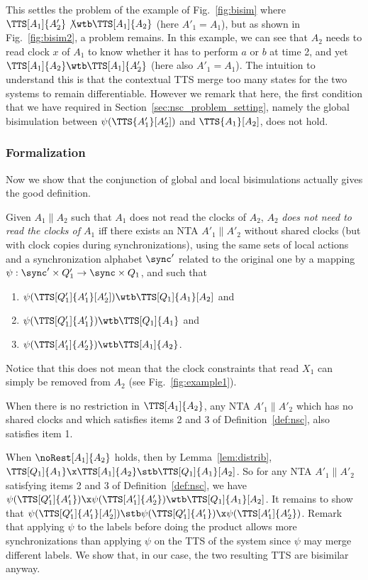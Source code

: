 \documentclass{LMCS}
\theoremstyle{plain}\newtheorem*{prop11}{Proposition~\ref{prop:states} bis}
\begin{document}
This settles the problem of the example of Fig.~\ref{fig:bisim} where
$\TTS[A_1]{A'_2}\not\wtb\TTS[A_1]{A_2}$ (here $A'_1=A_1$), but as shown in
Fig.~\ref{fig:bisim2}, a problem remains.
In this example, we can see that $A_2$
needs to read clock $x$ of $A_1$ to know whether it has to perform $a$
or $b$ at time 2, and yet $\TTS[A_1]{A_2}\wtb\TTS[A_1]{A_2'}$
(here also $A'_1=A_1$). The intuition
to understand this is that the contextual TTS merge too many states for the two
systems to remain differentiable. However we remark that here, the
first condition that we have required in Section~\ref{sec:nsc_problem_setting},
namely the global bisimulation between $\psi(\TTS{A'_1}[A'_2])$ and $\TTS{A_1}[A_2]$,
does not hold.


\subsubsection{Formalization}
Now we show that the conjunction of global and local bisimulations actually
gives the good definition.

\begin{defi}\label{def:nsc}
  Given $A_1\parallel A_2$ such that $A_1$ does not read the clocks of $A_2$,
  $A_2$ \emph{does not need to read the clocks of
    $A_1$} iff there exists an NTA $A'_1 \parallel A'_2$ without shared clocks
  (but with clock copies during synchronizations),
  using the same sets of local actions and a synchronization
  alphabet $\sync'$ related to the original one by a mapping $\psi: \sync'
  \times Q'_1 \rightarrow \sync \times Q_1$, and such that
  \begin{enumerate}
    \item $\psi(\TTS[Q_1']{A'_1}[A'_2])\wtb\TTS[Q_1]{A_1}[A_2]$ and
    \item $\psi(\TTS[Q'_1]{A'_1})\wtb\TTS[Q_1]{A_1}$ and
    \item $\psi(\TTS[A'_1]{A'_2})\wtb\TTS[A_1]{A_2}$.
  \end{enumerate}
\end{defi}

Notice that this does not mean that the clock constraints that read $X_1$ can
simply be removed from $A_2$ (see Fig.~\ref{fig:example1}).
\begin{lem}\label{lem:nsc}
  When there is no restriction in $\TTS[A_1]{A_2}$, any NTA $A'_1 \parallel
  A'_2$ which has no shared clocks and which satisfies items 2 and 3 of
  Definition~\ref{def:nsc}, also satisfies item 1.
\end{lem}
\proof
  When $\noRest[A_1]{A_2}$ holds, then by Lemma~\ref{lem:distrib},
  $\TTS[Q_1]{A_1}\x\TTS[A_1]{A_2}\stb\TTS[Q_1]{A_1}[A_2]$. So for any NTA
  $A'_1 \parallel A'_2$ satisfying items 2 and 3 of Definition~\ref{def:nsc},
  we have $\psi(\TTS[Q'_1]{A'_1})\x\psi(\TTS[A'_1]{A'_2}) \wtb
  \TTS[Q_1]{A_1}[A_2]$. It remains to show that
  $\psi(\TTS[Q'_1]{A'_1}[A'_2])\stb\psi(\TTS[Q'_1]{A'_1})\x\psi(\TTS[A'_1]{A'_2})$.
  Remark that applying $\psi$ to the labels before doing the product allows
  more synchronizations than applying $\psi$ on the TTS of the system since
  $\psi$ may merge different labels. We show that, in our case, the two
  resulting TTS are bisimilar anyway.
\end{document}
